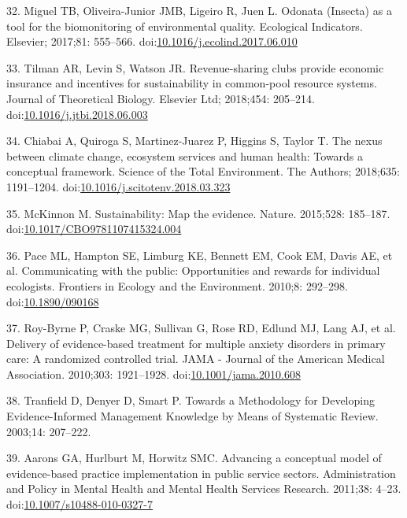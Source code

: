 \documentclass[10pt,letterpaper]{article}
\begin{document}
\hypertarget{ref-Miguel2017}{}
32. Miguel TB, Oliveira-Junior JMB, Ligeiro R, Juen L. Odonata (Insecta)
as a tool for the biomonitoring of environmental quality. Ecological
Indicators. Elsevier; 2017;81: 555--566.
doi:\href{https://doi.org/10.1016/j.ecolind.2017.06.010}{10.1016/j.ecolind.2017.06.010}

\hypertarget{ref-Tilman2018}{}
33. Tilman AR, Levin S, Watson JR. Revenue-sharing clubs provide
economic insurance and incentives for sustainability in common-pool
resource systems. Journal of Theoretical Biology. Elsevier Ltd;
2018;454: 205--214.
doi:\href{https://doi.org/10.1016/j.jtbi.2018.06.003}{10.1016/j.jtbi.2018.06.003}

\hypertarget{ref-Chiabai2018}{}
34. Chiabai A, Quiroga S, Martinez-Juarez P, Higgins S, Taylor T. The
nexus between climate change, ecosystem services and human health:
Towards a conceptual framework. Science of the Total Environment. The
Authors; 2018;635: 1191--1204.
doi:\href{https://doi.org/10.1016/j.scitotenv.2018.03.323}{10.1016/j.scitotenv.2018.03.323}

\hypertarget{ref-McKinnon2015}{}
35. McKinnon M. Sustainability: Map the evidence. Nature. 2015;528:
185--187.
doi:\href{https://doi.org/10.1017/CBO9781107415324.004}{10.1017/CBO9781107415324.004}

\hypertarget{ref-Pace2010}{}
36. Pace ML, Hampton SE, Limburg KE, Bennett EM, Cook EM, Davis AE, et
al. Communicating with the public: Opportunities and rewards for
individual ecologists. Frontiers in Ecology and the Environment. 2010;8:
292--298. doi:\href{https://doi.org/10.1890/090168}{10.1890/090168}

\hypertarget{ref-Roy-Byrne2010}{}
37. Roy-Byrne P, Craske MG, Sullivan G, Rose RD, Edlund MJ, Lang AJ, et
al. Delivery of evidence-based treatment for multiple anxiety disorders
in primary care: A randomized controlled trial. JAMA - Journal of the
American Medical Association. 2010;303: 1921--1928.
doi:\href{https://doi.org/10.1001/jama.2010.608}{10.1001/jama.2010.608}

\hypertarget{ref-Tranfield2003}{}
38. Tranfield D, Denyer D, Smart P. Towards a Methodology for Developing
Evidence-Informed Management Knowledge by Means of Systematic Review.
2003;14: 207--222.

\hypertarget{ref-Aarons2011}{}
39. Aarons GA, Hurlburt M, Horwitz SMC. Advancing a conceptual model of
evidence-based practice implementation in public service sectors.
Administration and Policy in Mental Health and Mental Health Services
Research. 2011;38: 4--23.
doi:\href{https://doi.org/10.1007/s10488-010-0327-7}{10.1007/s10488-010-0327-7}

\nolinenumbers
\end{document}
